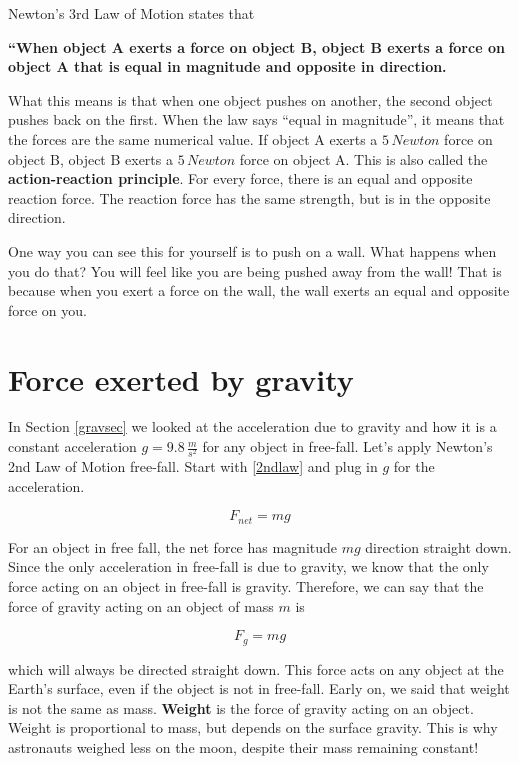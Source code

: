 \documentclass[12pt]{book}
\begin{document}
\linespace

Newton's 3rd Law of Motion states that

\hspace{10pt}

\textbf{``When object A exerts a force on object B, object B exerts a force on object A that is equal in magnitude and opposite in direction.}

\linespace

What this means is that when one object pushes on another, the second object pushes back on the first. When the law says ``equal in magnitude'', it means that the forces are the same numerical value. If object A exerts a $5 \, Newton$ force on object B, object B exerts a $5 \, Newton$ force on object A. This is also called the \textbf{action-reaction principle}. For every force, there is an equal and opposite reaction force. The reaction force has the same strength, but is in the opposite direction.

One way you can see this for yourself is to push on a wall. What happens when you do that? You will feel like you are being pushed away from the wall! That is because when you exert a force on the wall, the wall exerts an equal and opposite force on you. 

\section{Force exerted by gravity}

In Section \ref{gravsec} we looked at the acceleration due to gravity and how it is a constant acceleration $g = 9.8 \, \frac{m}{s^2}$ for any object in free-fall. Let's apply Newton's 2nd Law of Motion free-fall. Start with \ref{2ndlaw} and plug in $g$ for the acceleration.

\begin{equation}
F_{net} = mg
\end{equation}

For an object in free fall, the net force has magnitude $mg$ direction straight down. Since the only acceleration in free-fall is due to gravity, we know that the only force acting on an object in free-fall is gravity. Therefore, we can say that the force of gravity acting on an object of mass $m$ is

\begin{equation}
F_g = mg 
\label{fg}
\end{equation}

which will always be directed straight down. This force acts on any object at the Earth's surface, even if the object is not in free-fall. Early on, we said that weight is not the same as mass. \textbf{Weight} is the force of gravity acting on an object. Weight is proportional to mass, but depends on the surface gravity. This is why astronauts weighed less on the moon, despite their mass remaining constant!
\end{document}
